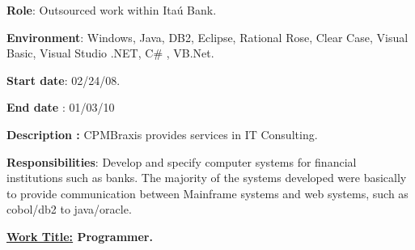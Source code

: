 \begin{itemize}
\begin{justify}
{\fontsize{10pt}{12.0pt}\selectfont \textbf{Role\tab \tab }: Outsourced work within Itaú Bank.\par}
\end{justify}\par

\begin{justify}
{\fontsize{10pt}{12.0pt}\selectfont \textbf{Environment}:\textbf{ }Windows, Java, DB2, Eclipse, Rational Rose, Clear Case, Visual Basic, Visual Studio .NET, C$\#$ , VB.Net. \par}
\end{justify}\par

\begin{justify}
{\fontsize{10pt}{12.0pt}\selectfont \textbf{Start date\tab }:\textbf{ }02/24/08. \par}
\end{justify}\par

\begin{justify}
{\fontsize{10pt}{12.0pt}\selectfont \textbf{End date \tabto{0.5in} }:\textbf{ }01/03/10\par}
\end{justify}\par

\begin{justify}
{\fontsize{10pt}{12.0pt}\selectfont \textbf{Description \tab : }CPMBraxis provides services in IT Consulting.\par}
\end{justify}\par

\begin{justify}
{\fontsize{10pt}{12.0pt}\selectfont \textbf{Responsibilities}: Develop and specify computer systems for financial institutions such as banks. The majority of the systems developed were basically to provide communication between Mainframe systems and web systems, such as cobol/db2 to java/oracle.\par}
\end{justify}\par


\vspace{\baselineskip}
\begin{justify}
\item {\fontsize{10pt}{12.0pt}\selectfont \textbf{\uline{Work Title:} \tab Programmer.}\par}
\end{justify}\par


\end{itemize}
